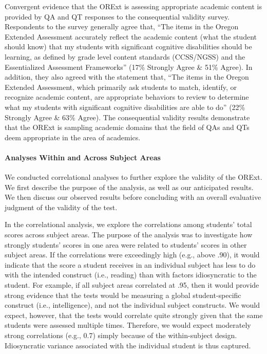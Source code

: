 \documentclass[]{article}
\let\oldparagraph\paragraph
\renewcommand{\paragraph}[1]{\oldparagraph{#1}\mbox{}}
\begin{document}
Convergent evidence that the ORExt is assessing appropriate academic
content is provided by QA and QT responses to the consequential validity
survey. Respondents to the survey generally agree that, ``The items in
the Oregon Extended Assessment accurately reflect the academic content
(what the student should know) that my students with significant
cognitive disabilities should be learning, as defined by grade level
content standards (CCSS/NGSS) and the Essentialized Assessment
Frameworks'' (17\% Strongly Agree \& 51\% Agree). In addition, they also
agreed with the statement that, ``The items in the Oregon Extended
Assessment, which primarily ask students to match, identify, or
recognize academic content, are appropriate behaviors to review to
determine what my students with significant cognitive disabilities are
able to do'' (22\% Strongly Agree \& 63\% Agree). The consequential
validity results demonstrate that the ORExt is sampling academic domains
that the field of QAs and QTs deem appropriate in the area of academics.

\paragraph{Analyses Within and Across Subject
Areas}\label{analyses-within-and-across-subject-areas}

We conducted correlational analyses to further explore the validity of
the ORExt. We first describe the purpose of the analysis, as well as our
anticipated results. We then discuss our observed results before
concluding with an overall evaluative judgment of the validity of the
test.

In the correlational analysis, we explore the correlations among
students' total scores across subject areas. The purpose of the analysis
was to investigate how strongly students' scores in one area were
related to students' scores in other subject areas. If the correlations
were exceedingly high (e.g., above .90), it would indicate that the
score a student receives in an individual subject has less to do with
the intended construct (i.e., reading) than with factors idiosyncratic
to the student. For example, if all subject areas correlated at .95,
then it would provide strong evidence that the tests would be measuring
a global student-specific construct (i.e., intelligence), and not the
individual subject constructs. We would expect, however, that the tests
would correlate quite strongly given that the same students were
assessed multiple times. Therefore, we would expect moderately strong
correlations (e.g., 0.7) simply because of the within-subject design.
Idiosyncratic variance associated with the individual student is thus
captured.
\end{document}
